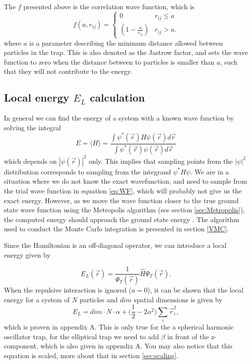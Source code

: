\documentclass[norsk,a4paper,12pt]{article}
\begin{document}
The $f$ presented above is the correlation wave function, which is 
\begin{equation}
\label{eq:WF_interaction_part}
f(a,r_{ij})=
\begin{cases} 
   0 & r_{ij} \leq a \\
   \left(1-\frac{a}{r_{ij}}\right) & r_{ij} > a.
\end{cases}
\end{equation}
where $a$ is a parameter describing the minimum distance allowed between particles in the trap. This is also denoted as the Jastrow factor, and sets the wave function to zero when the distance between to particles is smaller than $a$, such that they will not contribute to the energy. 

\subsection{Local energy $E_L$ calculation}
In general we can find the energy of a system with a known wave function by solving the integral
\begin{equation}
E=\langle H\rangle = \frac{\int\psi^*(\vec{r})H\psi(\vec{r})d\vec{r}}{\int\psi^*(\vec{r})\psi(\vec{r})d\vec{r}}
\label{eq:general_energy}
\end{equation}
which depends on $|\psi(\vec{r})|^2$ only. This implies that sampling points from the $|\psi|^2$ distribution corresponds to sampling from the integrand $\psi^*H\psi$. We are in a situation where we do not know the exact wavefunction, and need to sample from the trial wave function in equation \ref{eq:WF}, which will probably not give us the exact energy. However, as we move the wave function closer to the true ground state wave function using the Metropolis algorithm (see section \ref{sec:Metropolis}), the computed energy should approach the ground state energy \cite{JKNilsen}. The algorithm used to conduct the Monte Carlo integration is presented in section \ref{VMC}.

Since the Hamiltonian is an off-diagonal operator, we can introduce a local energy given by

\begin{equation}
E_L(\vec{r})=\frac{1}{\Psi_T(\vec{r})}\hat{H}\Psi_T(\vec{r}).
\label{eq:Local_energy}
\end{equation}
When the repulsive interaction is ignored ($a=0$), it can be shown that the local energy for a system of $N$ particles and $dim$ spatial dimensions is given by
\begin{equation}
E_L=dim\cdot N\cdot \alpha + \Big(\frac{1}{2}-2\alpha^2\Big)\sum_i\vec{r}_i^2,
\end{equation}
which is proven in appendix A. This is only true for the a spherical harmonic oscillator trap, for the elliptical trap we need to add $\beta$ in front of the z-component, which is also given in appendix A. You may also notice that this equation is scaled, more about that in section \ref{sec:scaling}.
\end{document}
